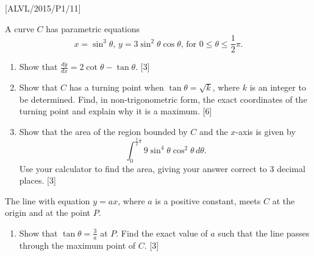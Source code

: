 \item {[}ALVL/2015/P1/11{]}

A curve $C$ has parametric equations 
\[
x=\sin^{3}\theta,\,y=3\sin^{2}\theta\cos\theta,\,\text{for }0\leq\theta\le\frac{1}{2}\pi.
\]
 
\begin{enumerate}
\item Show that $\frac{dy}{dx}=2\cot\theta-\tan\theta$.\hfill{} {[}3{]}
\item Show that $C$ has a turning point when $\tan\theta=\sqrt{k}$, where
$k$ is an integer to be determined. Find, in non-trigonometric form,
the exact coordinates of the turning point and explain why it is a
maximum. \hfill{}{[}6{]} 
\item Show that the area of the region bounded by $C$ and the $x$-axis
is given by 
\[
\int_{0}^{\frac{1}{2}\pi}9\sin^{4}\theta\cos^{2}\theta\,d\theta.
\]
Use your calculator to find the area, giving your answer correct to
3 decimal places. \hfill{}{[}3{]}
\end{enumerate}
The line with equation $y=ax$, where $a$ is a positive constant,
meets $C$ at the origin and at the point $P$. 
\begin{enumerate}
\item Show that $\tan\theta=\frac{3}{a}$ at $P$. Find the exact value
of $a$ such that the line passes through the maximum point of $C$.
\hfill{}{[}3{]}
\end{enumerate}
